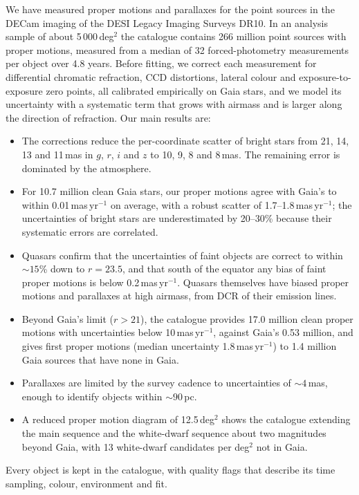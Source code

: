 \documentclass[usenatbib]{mnras}   %
\newcommand{\todo}[1]{{\color{red}{[TODO: #1]}}}
\begin{document}
We have measured proper motions and parallaxes for the point sources in the DECam imaging of the DESI Legacy Imaging Surveys DR10. In an analysis sample of about 5\,000\,deg$^2$ the catalogue contains 266 million point sources with proper motions, measured from a median of 32 forced-photometry measurements per object over 4.8 years. Before fitting, we correct each measurement for differential chromatic refraction, CCD distortions, lateral colour and exposure-to-exposure zero points, all calibrated empirically on Gaia stars, and we model its uncertainty with a systematic term that grows with airmass and is larger along the direction of refraction. Our main results are:
\begin{itemize}
    \item The corrections reduce the per-coordinate scatter of bright stars from 21, 14, 13 and 11\,mas in $g$, $r$, $i$ and $z$ to 10, 9, 8 and 8\,mas. The remaining error is dominated by the atmosphere.
    \item For 10.7 million clean Gaia stars, our proper motions agree with Gaia's to within 0.01\,mas\,yr$^{-1}$ on average, with a robust scatter of 1.7--1.8\,mas\,yr$^{-1}$; the uncertainties of bright stars are underestimated by 20--30\% because their systematic errors are correlated.
    \item Quasars confirm that the uncertainties of faint objects are correct to within $\sim\!15$\% down to $r = 23.5$, and that south of the equator any bias of faint proper motions is below 0.2\,mas\,yr$^{-1}$. Quasars themselves have biased proper motions and parallaxes at high airmass, from DCR of their emission lines.
    \item Beyond Gaia's limit ($r > 21$), the catalogue provides 17.0 million clean proper motions with uncertainties below 10\,mas\,yr$^{-1}$, against Gaia's 0.53 million, and gives first proper motions (median uncertainty 1.8\,mas\,yr$^{-1}$) to 1.4 million Gaia sources that have none in Gaia.
    \item Parallaxes are limited by the survey cadence to uncertainties of $\sim\!4$\,mas, enough to identify objects within $\sim\!90$\,pc.
    \item A reduced proper motion diagram of 12.5\,deg$^2$ shows the catalogue extending the main sequence and the white-dwarf sequence about two magnitudes beyond Gaia, with 13 white-dwarf candidates per deg$^2$ not in Gaia.
\end{itemize}
Every object is kept in the catalogue, with quality flags that describe its time sampling, colour, environment and fit. \todo{One sentence on the data release once decided.}
\end{document}
